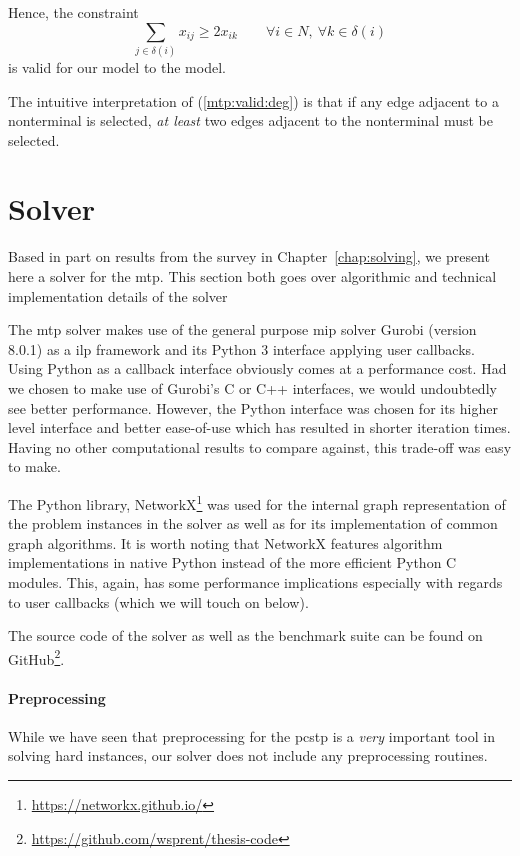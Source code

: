  Hence, the constraint
 \begin{equation}\label{mtp:valid:deg}
   \sum_{j \in \delta(i)}x_{ij} \geq 2 x_{ik} \qquad \forall i \in N, \: \forall k \in \delta(i)
 \end{equation}
 is valid for our model to the model.

 The intuitive interpretation of (\ref{mtp:valid:deg}) is that if any edge adjacent to
 a nonterminal is selected, \textit{at least} two edges adjacent to the nonterminal must be selected.
\section{Solver}\label{sec:mtp:solver}
Based in part on results from the survey in Chapter~\ref{chap:solving}, we present here
a solver for the \gls{mtp}. This section both goes over algorithmic and technical
implementation details of the solver

The \gls{mtp} solver makes use of the general purpose \gls{mip} solver
Gurobi \citep{gurobi} (version 8.0.1) as a \gls{ilp} framework
and its Python 3 interface applying user callbacks.
Using Python as a callback interface obviously comes at a performance cost.
Had we chosen to make use of Gurobi's C or C++ interfaces,
we would undoubtedly see better performance.
However, the Python interface was chosen for its higher level interface
and better ease-of-use which has resulted in shorter iteration times.
Having no other computational results
to compare against, this trade-off was easy to make.

The Python library,
NetworkX\footnote{\url{https://networkx.github.io/}} \citep{hagberg2008exploring}
was used for the internal graph representation of the
problem instances in the solver as well as for its implementation of common
graph algorithms.
It is worth noting that NetworkX features algorithm implementations
in native Python instead of the more efficient Python C modules. This, again, has some
performance implications especially with regards to user callbacks (which we will
 touch on below).

The source code of the solver as well as the benchmark suite
can be found on GitHub\footnote{\url{https://github.com/wsprent/thesis-code}}.

\paragraph{Preprocessing}

While we have seen that preprocessing for the \gls{pcstp} is a \textit{very} important
tool in solving hard instances, our solver does not include any preprocessing routines.


